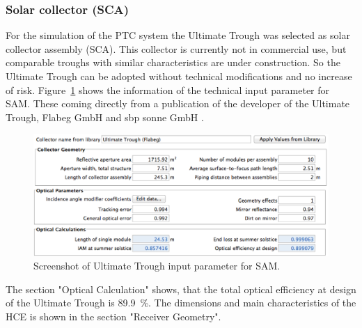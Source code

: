 \subsubsection{Solar collector (SCA)}
For the simulation of the PTC system the Ultimate Trough was selected as solar collector assembly (SCA). This collector is currently not in commercial use, but comparable troughs with similar characteristics are under construction. So the Ultimate Trough can be adopted  without technical modifications and no increase of risk. Figure~\ref{PTC_Ultimate_config} shows the information of the technical input parameter for SAM. These coming directly from a publication of the developer of the Ultimate Trough, Flabeg GmbH and sbp sonne GmbH \cite{Riffelmann2014}. 
\begin{figure}[bhtp]
\centering
\includegraphics[width=0.95\linewidth]{FIG/PTC_Ultimate_config}
\caption[Screenshot of Ultimate Trough input parameter for SAM.]{Screenshot of Ultimate Trough input parameter for SAM.}\label{PTC_Ultimate_config}
\end{figure}
The section "Optical Calculation" shows, that the total optical efficiency at design of the Ultimate Trough is 89.9~\%. The dimensions and main characteristics of the HCE is shown in the section "Receiver Geometry".
